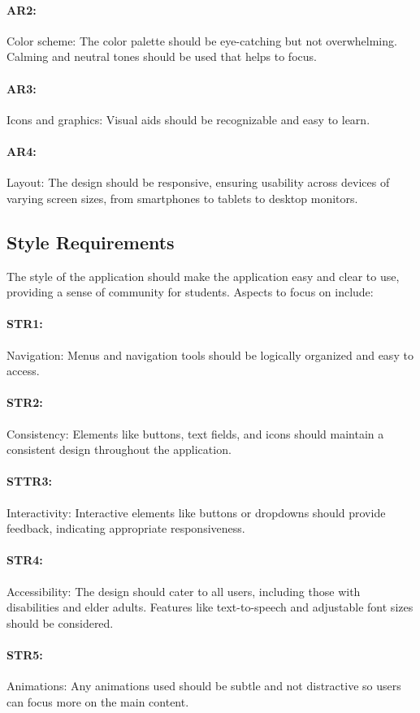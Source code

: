 \documentclass[12pt]{article}
\begin{document}
\paragraph{AR2:}Color scheme: The color palette should be eye-catching but not overwhelming. Calming and neutral tones should be used that helps to focus.
\paragraph{AR3:}Icons and graphics: Visual aids should be recognizable and easy to learn.
\paragraph{AR4:}Layout: The design should be responsive, ensuring usability across devices of varying screen sizes, from smartphones to tablets to desktop monitors.

\subsection{Style Requirements}
The style of the application should make the application easy and clear to use, providing a sense of community for students. Aspects to focus on include:
\paragraph{STR1:}Navigation: Menus and navigation tools should be logically organized and easy to access. 
\paragraph{STR2:}Consistency: Elements like buttons, text fields, and icons should maintain a consistent design throughout the application.
\paragraph{STTR3:}Interactivity: Interactive elements like buttons or dropdowns should provide feedback, indicating appropriate responsiveness.
\paragraph{STR4:}Accessibility: The design should cater to all users, including those with disabilities and elder adults. Features like text-to-speech and adjustable font sizes should be considered.
\paragraph{STR5:}Animations: Any animations used should be subtle and not distractive so users can focus more on the main content. 
\end{document}
